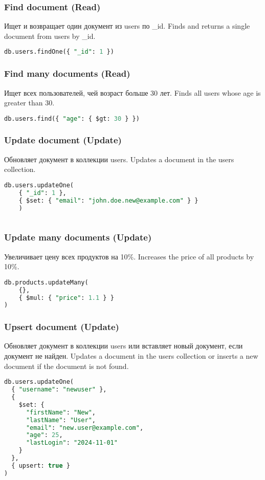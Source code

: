 \documentclass[a4paper,12pt]{article}
\begin{document}
\subsubsection{Find document (Read)}
Ищет и возвращает один документ из users по \_id.
\newline
Finds and returns a single document from users by \_id.

\begin{lstlisting}[language=SQL]
db.users.findOne({ "_id": 1 })
\end{lstlisting}

\subsubsection{Find many documents (Read)}
Ищет всех пользователей, чей возраст больше 30 лет.
\newline
Finds all users whose age is greater than 30.

\begin{lstlisting}[language=SQL]
db.users.find({ "age": { $gt: 30 } })
\end{lstlisting}


\subsubsection{Update document (Update)}
Обновляет документ в коллекции users.
\newline    
Updates a document in the users collection.
\begin{lstlisting}[language=SQL]
db.users.updateOne(
    { "_id": 1 },
    { $set: { "email": "john.doe.new@example.com" } }
    )
      
\end{lstlisting}

\subsubsection{Update many documents (Update)}
Увеличивает цену всех продуктов на 10\%.
\newline
Increases the price of all products by 10\%.
\begin{lstlisting}[language=SQL]
db.products.updateMany(
    {},
    { $mul: { "price": 1.1 } }
)
\end{lstlisting}

\subsubsection{Upsert document (Update)}
Обновляет документ в коллекции users или вставляет новый документ, если документ не найден.
\newline
Updates a document in the users collection or inserts a new document if the document is not found.
\begin{lstlisting}[language=SQL]
db.users.updateOne(
  { "username": "newuser" },  
  { 
    $set: { 
      "firstName": "New",
      "lastName": "User",
      "email": "new.user@example.com",
      "age": 25,
      "lastLogin": "2024-11-01"
    } 
  },
  { upsert: true }
)

\end{lstlisting}
\end{document}
